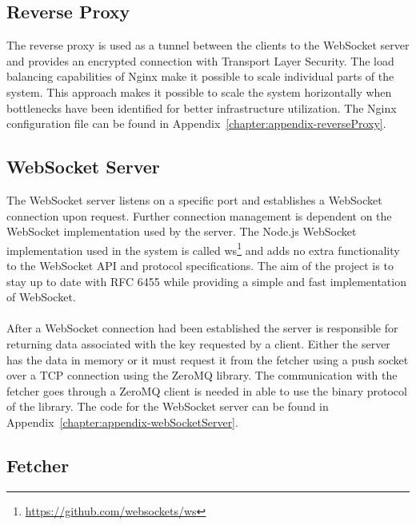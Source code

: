 \subsection{Reverse Proxy}

The reverse proxy is used as a tunnel between the clients to the WebSocket server and provides an encrypted connection with Transport Layer Security. The load balancing capabilities of Nginx make it possible to scale individual parts of the system. This approach makes it possible to scale the system horizontally when bottlenecks have been identified for better infrastructure utilization. The Nginx configuration file can be found in Appendix~\ref{chapter:appendix-reverseProxy}.


\subsection{WebSocket Server}

The WebSocket server listens on a specific port and establishes a WebSocket connection upon request. Further connection management is dependent on the WebSocket implementation used by the server. The Node.js WebSocket implementation used in the system is called ws\footnote{\url{https://github.com/websockets/ws}} and adds no extra functionality to the WebSocket API and protocol specifications. The aim of the project is to stay up to date with RFC 6455 while providing a simple and fast implementation of WebSocket.
\\ \\
After a WebSocket connection had been established the server is responsible for returning data associated with the key requested by a client. Either the server has the data in memory or it must request it from the fetcher using a push socket over a TCP connection using the ZeroMQ library. The communication with the fetcher goes through a ZeroMQ client is needed in able to use the binary protocol of the library. The code for the WebSocket server can be found in Appendix~\ref{chapter:appendix-webSocketServer}.

\subsection{Fetcher}

